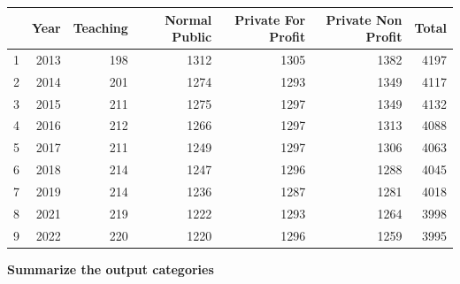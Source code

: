 \documentclass[12pt]{article}
\begin{document}
\begin{table}
    \begin{tabular}{rrrrrrr}
        \toprule
          & Year & Teaching & Normal Public & Private For Profit & Private Non Profit & Total \\
        \midrule
        1 & 2013 & 198      & 1312          & 1305               & 1382               & 4197  \\
        2 & 2014 & 201      & 1274          & 1293               & 1349               & 4117  \\
        3 & 2015 & 211      & 1275          & 1297               & 1349               & 4132  \\
        4 & 2016 & 212      & 1266          & 1297               & 1313               & 4088  \\
        5 & 2017 & 211      & 1249          & 1297               & 1306               & 4063  \\
        6 & 2018 & 214      & 1247          & 1296               & 1288               & 4045  \\
        7 & 2019 & 214      & 1236          & 1287               & 1281               & 4018  \\
        8 & 2021 & 219      & 1222          & 1293               & 1264               & 3998  \\
        9 & 2022 & 220      & 1220          & 1296               & 1259               & 3995  \\
        \bottomrule
    \end{tabular}
\end{table}

\textbf{Summarize the output categories}
\end{document}
